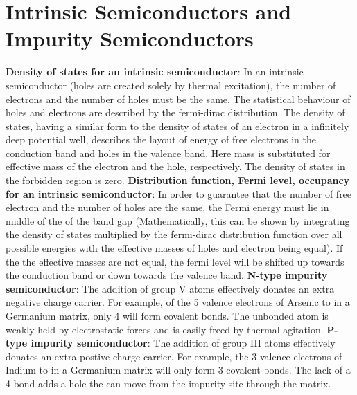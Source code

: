 \documentclass{article}
\numberwithin{equation}{section}
\begin{document}
\section*{Intrinsic Semiconductors and Impurity Semiconductors}
\textbf{Density of states for an intrinsic semiconductor}: In an intrinsic semiconductor (holes are created solely by thermal excitation), the number of electrons and the number of holes must be the same. The statistical behaviour of holes and electrons are described by the fermi-dirac distribution. The density of states, having a similar form to the density of states of an electron in a infinitely deep potential well, describes the layout of energy of free electrons in the conduction band and holes in the valence band. Here mass is substituted for effective mass of the electron and the hole, respectively. The density of states in the forbidden region is zero.  
\newline
\textbf{Distribution function, Fermi level, occupancy for an intrinsic semiconductor}: In order to guarantee that the number of free electron and the number of holes are the same, the Fermi energy must lie in middle of the of the band gap (Mathematically, this can be shown by integrating the density of states multiplied by the fermi-dirac distribution function over all possible energies with the effective masses of holes and electron being equal). If the the effective masses are not equal, the fermi level will be shifted up towards the conduction band or down towards the valence band.
\newline
\textbf{N-type impurity semiconductor}: The addition of group V atoms effectively donates an extra negative charge carrier. For example, of the 5 valence electrons of Arsenic to in a Germanium matrix, only 4 will form covalent bonds. The unbonded atom is weakly held by electrostatic forces and is easily freed by thermal agitation.
\newline
\textbf{P-type impurity semiconductor}: The addition of group III atoms effectively donates an extra postive charge carrier. For example, the 3 valence electrons of Indium to in a Germanium matrix will only form 3 covalent bonds. The lack of a 4 bond adds a hole the can move from the impurity site through the matrix.
\newline
\end{document}

